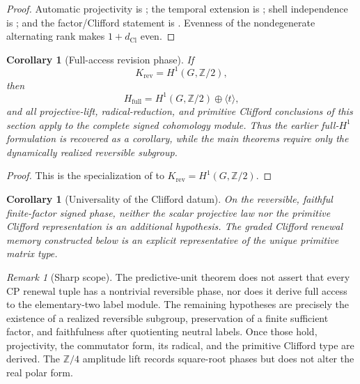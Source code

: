 \documentclass[11pt]{article}
\newtheorem{corollary}[theorem]{Corollary}
\theoremstyle{definition}
\theoremstyle{remark}
\newtheorem{remark}[theorem]{Remark}
\newcommand{\Z}{\mathbb{Z}}
\newcommand{\Zfour}{\mathbb{Z}/4}
\newcommand{\Hf}{H_{\mathrm{full}}}
\newcommand{\dCl}{d_{\mathrm{Cl}}}
\begin{document}
\begin{proof}
Automatic projectivity is ; the temporal
extension is ; shell independence is
; and the factor/Clifford statement is
.  Evenness of the
nondegenerate alternating rank makes \(1+\dCl\) even.
\end{proof}

\begin{corollary}[Full-access revision phase]
\label{cor:full-access-revision-phase}
If
\[
  K_{\mathrm{rev}}=H^1(G,\Z/2),
\]
then
\[
  \Hf=H^1(G,\Z/2)\oplus\langle t\rangle,
\]
and all projective-lift, radical-reduction, and primitive Clifford conclusions
of this section apply to the complete signed cohomology module.  Thus the
earlier full-\(H^1\) formulation is recovered as a corollary, while the main
theorems require only the dynamically realized reversible subgroup.
\end{corollary}

\begin{proof}
This is the specialization of
to \(K_{\mathrm{rev}}=H^1(G,\Z/2)\).
\end{proof}

\begin{corollary}[Universality of the Clifford datum]
\label{cor:universality-clifford-main}
On the reversible, faithful finite-factor signed phase, neither the scalar
projective law nor the primitive Clifford representation is an additional
hypothesis.  The graded Clifford renewal memory constructed below is an explicit
representative of the unique primitive matrix type.
\end{corollary}

\begin{remark}[Sharp scope]
\label{rem:cx-status}
The predictive-unit theorem does not assert that every CP renewal tuple has a
nontrivial reversible phase, nor does it derive full access to the
elementary-two label module.  The remaining hypotheses are precisely the
existence of a realized reversible subgroup, preservation of a finite
sufficient factor, and faithfulness after
quotienting neutral labels.  Once those hold, projectivity, the commutator form,
its radical, and the primitive Clifford type are derived.  The \(\Zfour\)
amplitude lift records square-root phases but does not alter the real polar form.
\end{remark}
\end{document}
